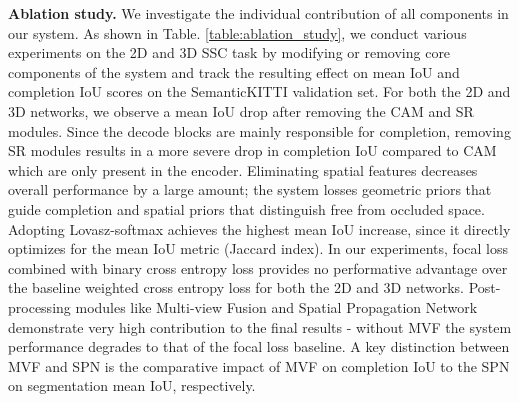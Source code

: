 \documentclass{article}
\begin{document}
\textbf{Ablation study.} We investigate the individual contribution of all components in our system. As shown in Table. \ref{table:ablation_study}, we conduct various experiments on the 2D and 3D SSC task by modifying or removing core components of the system and track the resulting effect on mean IoU and completion IoU scores on the SemanticKITTI validation set. For both the 2D and 3D networks, we observe a mean IoU drop after removing the CAM and SR modules. Since the decode blocks are mainly responsible for completion, removing SR modules results in a more severe drop in completion IoU compared to CAM which are only present in the encoder. Eliminating spatial features decreases overall performance by a large amount; the system losses geometric priors that guide completion and spatial priors that distinguish free from occluded space. Adopting Lovasz-softmax achieves the highest mean IoU increase, since it directly optimizes for the mean IoU metric (Jaccard index). In our experiments, focal loss combined with binary cross entropy loss provides no performative advantage over the baseline weighted cross entropy loss for both the 2D and 3D networks. Post-processing modules like Multi-view Fusion and Spatial Propagation Network demonstrate very high contribution to the final results - without MVF the system performance degrades to that of the focal loss baseline. A key distinction between MVF and SPN is the comparative impact of MVF on completion IoU to the SPN on segmentation mean IoU, respectively. 
\end{document}
